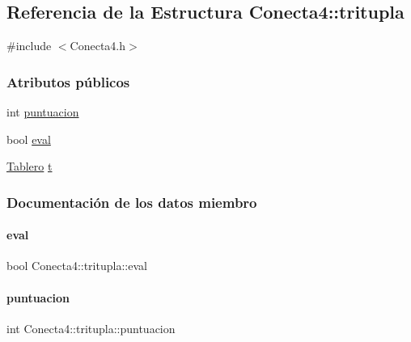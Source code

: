\hypertarget{structConecta4_1_1tritupla}{}\subsection{Referencia de la Estructura Conecta4\+:\+:tritupla}
\label{structConecta4_1_1tritupla}


{\ttfamily \#include $<$Conecta4.\+h$>$}

\subsubsection*{Atributos públicos}
\begin{DoxyCompactItemize}
\item 
int \hyperlink{structConecta4_1_1tritupla_a79086d1d426fbee3dda5c807d279a776}{puntuacion}
\item 
bool \hyperlink{structConecta4_1_1tritupla_a8a9db3376aa2bdb5c8b9f31c89e119e9}{eval}
\item 
\hyperlink{classTablero}{Tablero} \hyperlink{structConecta4_1_1tritupla_a33cad8a0dc6bf63da02f04c429dd9ec2}{t}
\end{DoxyCompactItemize}


\subsubsection{Documentación de los datos miembro}
\hypertarget{structConecta4_1_1tritupla_a8a9db3376aa2bdb5c8b9f31c89e119e9}{}\label{structConecta4_1_1tritupla_a8a9db3376aa2bdb5c8b9f31c89e119e9} 
\paragraph{\texorpdfstring{eval}{eval}}
{\footnotesize\ttfamily bool Conecta4\+::tritupla\+::eval}

\hypertarget{structConecta4_1_1tritupla_a79086d1d426fbee3dda5c807d279a776}{}\label{structConecta4_1_1tritupla_a79086d1d426fbee3dda5c807d279a776} 
\paragraph{\texorpdfstring{puntuacion}{puntuacion}}
{\footnotesize\ttfamily int Conecta4\+::tritupla\+::puntuacion}

